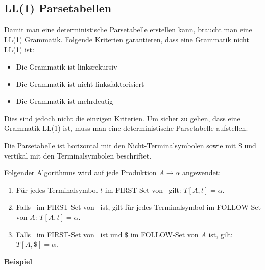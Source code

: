 \subsection{LL(1) Parsetabellen}

Damit man eine deterministische Parsetabelle erstellen kann, braucht man eine
LL(1) Grammatik. Folgende Kriterien garantieren, dass eine Grammatik nicht LL(1)
ist:

\begin{itemize}
	\item Die Grammatik ist linksrekursiv
	\item Die Grammatik ist nicht linksfaktorisiert
	\item Die Grammatik ist mehrdeutig
\end{itemize}

Dies sind jedoch nicht die einzigen Kriterien. Um sicher zu gehen, dass eine
Grammatik LL(1) ist, muss man eine deterministische Parsetabelle aufstellen.

Die Parsetabelle ist horizontal mit den Nicht-Terminalsymbolen sowie mit $\$$
und vertikal mit den Terminalsymbolen beschriftet.

Folgender Algorithmus wird auf jede Produktion $A \rightarrow \alpha$ angewendet:

\begin{enumerate}
	\item Für jedes Terminalsymbol $t$ im FIRST-Set von \textalpha\ gilt: $T[A,t]
		= \alpha$.
	\item Falls \textepsilon\ im FIRST-Set von \textalpha\ ist, gilt für jedes
		Terminalsymbol im FOLLOW-Set von $A$: $T[A,t] = \alpha$.
	\item Falls \textepsilon\ im FIRST-Set von \textalpha\ ist und $\$$ im
		FOLLOW-Set von $A$ ist, gilt: $T[A,\$] = \alpha$.
\end{enumerate}

\textbf{Beispiel}

